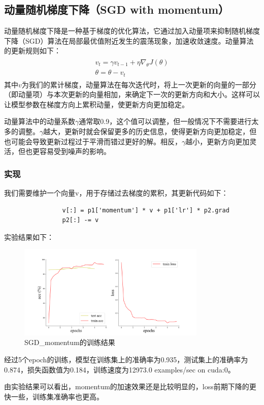 \documentclass[10.5pt,a4paper]{article}%
\begin{document}
        \subsection{动量随机梯度下降（SGD with momentum）}
            动量随机梯度下降\cite{momentum}是一种基于梯度的优化算法，它通过加入动量项来抑制随机梯度下降（SGD）算法在局部最优值附近发生的震荡现象，加速收敛速度。动量算法的更新规则如下：
            \begin{align*}
                \begin{array}{l}v_t=\gamma v_{t-1}+\eta\nabla_\theta J(\theta)\\ \theta=\theta-v_t\end{array}
            \end{align*}
            其中$v$为我们的累计梯度，动量算法在每次迭代时，将上一次更新的向量的一部分（即动量项）与本次更新的向量相加，来确定下一次的更新方向和大小。这样可以让模型参数在梯度方向上累积动量，使更新方向更加稳定。\par
            动量算法中的动量系数$\gamma$通常取0.9，这个值可以调整，但一般情况下不需要进行太多的调整。$\gamma$越大，更新时就会保留更多的历史信息，使得更新方向更加稳定，但也可能会导致更新过程过于平滑而错过更好的解。相反，$\gamma$越小，更新方向更加灵活，但也更容易受到噪声的影响。
\newpage
            \subsubsection{实现}
            我们需要维护一个向量v，用于存储过去梯度的累积，其更新代码如下：
            \begin{lstlisting}
                v[:] = p1['momentum'] * v + p1['lr'] * p2.grad
                p2[:] -= v
            \end{lstlisting}\par
            实验结果如下：
            \begin{figure}[H]
            \centering
                \includegraphics[width=0.8\textwidth]{imgs_5e/SGD_momentum.png}
              \caption{SGD\_momentum的训练结果}
              \label{fig:SGD_m}
            \end{figure} 
            经过5个epoch的训练，模型在训练集上的准确率为0.935，测试集上的准确率为0.874，损失函数值为0.184，训练速度为12973.0 examples/sec on cuda:0。\par
            由实验结果可以看出，momentum的加速效果还是比较明显的，loss前期下降的更快一些，训练集准确率也更高。
\end{document}
